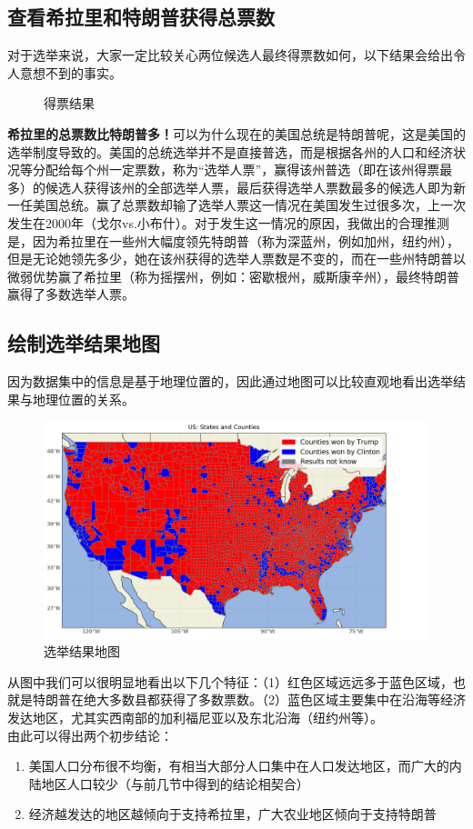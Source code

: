 \documentclass[
12pt, %
UTF8
]{fphw}
\begin{document}
	\subsection{查看希拉里和特朗普获得总票数}
	对于选举来说，大家一定比较关心两位候选人最终得票数如何，以下结果会给出令人意想不到的事实。
	\begin{figure}[H]
	\caption{得票结果}
	\end{figure}
	\textbf{希拉里的总票数比特朗普多！}可以为什么现在的美国总统是特朗普呢，这是美国的选举制度导致的。美国的总统选举并不是直接普选，而是根据各州的人口和经济状况等分配给每个州一定票数，称为“选举人票”，赢得该州普选（即在该州得票最多）的候选人获得该州的全部选举人票，最后获得选举人票数最多的候选人即为新一任美国总统。赢了总票数却输了选举人票这一情况在美国发生过很多次，上一次发生在2000年（戈尔vs.小布什）。对于发生这一情况的原因，我做出的合理推测是，因为希拉里在一些州大幅度领先特朗普（称为深蓝州，例如加州，纽约州），但是无论她领先多少，她在该州获得的选举人票数是不变的，而在一些州特朗普以微弱优势赢了希拉里（称为摇摆州，例如：密歇根州，威斯康辛州），最终特朗普赢得了多数选举人票。
	\newpage
	\subsection{绘制选举结果地图}
	因为数据集中的信息是基于地理位置的，因此通过地图可以比较直观地看出选举结果与地理位置的关系。%
	\begin{figure}[H]
		\centering
		\includegraphics[scale = 0.7]{election_map.png}
		\caption{选举结果地图}
	\end{figure}
	从图中我们可以很明显地看出以下几个特征：（1）红色区域远远多于蓝色区域，也就是特朗普在绝大多数县都获得了多数票数。（2）蓝色区域主要集中在沿海等经济发达地区，尤其实西南部的加利福尼亚以及东北沿海（纽约州等）。\\
	  由此可以得出两个初步结论：
	\begin{enumerate}
		\item 美国人口分布很不均衡，有相当大部分人口集中在人口发达地区，而广大的内陆地区人口较少（与前几节中得到的结论相契合）
		\item 经济越发达的地区越倾向于支持希拉里，广大农业地区倾向于支持特朗普
	\end{enumerate}
\end{document}
